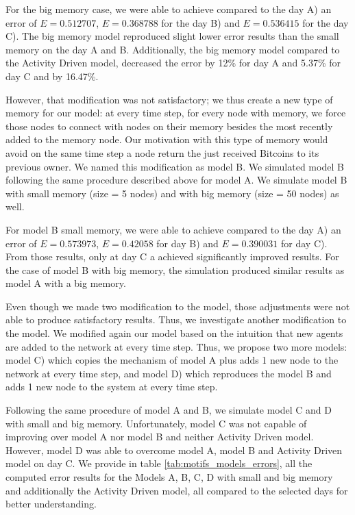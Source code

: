\documentclass[../../thesis.tex]{subfiles}
\begin{document}
For the big memory case, we were able to achieve compared to the day A) an error of  $E=0.512707$,  $E=0.368788$ for the day B) and  $E=0.536415$ for the day C). The big memory model reproduced slight lower error results than the small memory on the day A and B. Additionally, the big memory model compared to the Activity Driven model, decreased the error by 12\% for day A and 5.37\% for day C and by 16.47\%.

However, that modification was not satisfactory; we thus create a new type of memory for our model: at every time step, for every node with memory, we force those nodes to connect with nodes on their memory besides the most recently added to the memory node. Our motivation with this type of memory would avoid on the same time step a node return the just received Bitcoins to its previous owner. We named this modification as model B. We simulated model B following the same procedure described above for model A. We simulate model B with small memory (size = 5 nodes) and with big memory (size = 50 nodes) as well.
  
For model B small memory, we were able to achieve compared to the day A) an error of $E=0.573973$,  $E=0.42058$ for day B) and $E=0.390031$ for day C). From those results, only at day C a achieved significantly improved results. For the case of model B with big memory, the simulation produced similar results as model A with a big memory.

Even though we made two modification to the model, those adjustments were not able to produce satisfactory results. Thus, we investigate another modification to the model. We modified again our model based on the intuition that new agents are added to the network at every time step. Thus, we propose two more models: model C) which copies the mechanism of model A plus adds 1 new node to the network at every time step, and model D) which reproduces the model B and adds 1 new node to the system at every time step. 

Following the same procedure of model A and B, we simulate model C and D with small and big memory. Unfortunately, model C was not capable of improving over model A nor model B and neither Activity Driven model. However, model D was able to overcome model A, model B and Activity Driven model on day C. We provide in table \ref{tab:motifs_models_errors}, all the computed error results for the Models A, B, C, D with small and big memory and additionally the Activity Driven model, all compared to the selected days for better understanding.  
\end{document}
